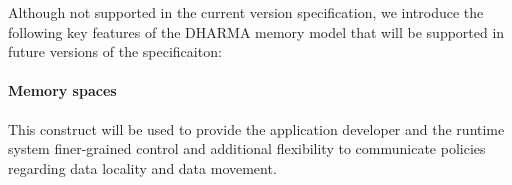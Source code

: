 




Although not supported in the current version specification, we introduce the
following key features of the DHARMA memory model that will be supported in future versions
of the specificaiton:

\paragraph{Memory spaces} This
  construct will be used to provide the application developer and the runtime
  system finer-grained control and additional flexibility to communicate
  policies regarding data locality and data movement. 







